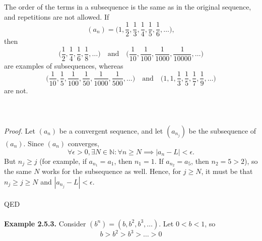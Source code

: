 \documentclass{article}
\begin{document}
                The order of the terms in a subsequence is the same as in the original sequence, and repetitions are not allowed. If
                \begin{equation*}
                    (a_n) = \bigg(1, \frac{1}{2}, \frac{1}{3}, \frac{1}{4}, \frac{1}{5}, \frac{1}{6}, \dots \bigg),
                \end{equation*}
                then
                \begin{equation*}
                    \bigg(\frac{1}{2}, \frac{1}{4}, \frac{1}{6}, \frac{1}{8}, \dots \bigg) \quad \text{and} \quad \bigg(\frac{1}{10}, \frac{1}{100}, \frac{1}{1000}, \frac{1}{10000}, \dots \bigg)
                \end{equation*}
                are examples of subsequences, whereas
                \begin{equation*}
                     \bigg(\frac{1}{10}, \frac{1}{5}, \frac{1}{100}, \frac{1}{50}, \frac{1}{1000}, \frac{1}{500}, \dots \bigg) \quad \text{and} \quad \bigg(1,1,\frac{1}{3}, \frac{1}{5}, \frac{1}{7}, \frac{1}{9}, \dots \bigg)
                \end{equation*}
                are not.
                \\ \\
                \\ \\
                \textit{Proof.} Let $(a_n)$ be a convergent sequence, and let $(a_{n_j})$ be the subsequence of $(a_n)$. Since $(a_n)$ converges, 
                \begin{equation*}
                    \forall \epsilon > 0, \exists N \in \mathbb{N}: \forall n \geq N \implies |a_n-L|<\epsilon.
                \end{equation*}
                But $n_j \geq j$ (for example, if $a_{n_1} = a_1$, then $n_1 = 1$. If $a_{n_2} = a_5$, then $n_2=5 > 2$), so the same $N$ works for the subsequence as well. Hence, for $j \geq N$, it must be that $n_j \geq j \geq N$ and $|a_{n_j}-L|<\epsilon$.\\ \\
                QED\\ \\
                \textbf{Example 2.5.3.} Consider $(b^n) = (b,b^2,b^3,\dots)$. Let $0<b<1$, so
                \begin{equation*}
                    b>b^2>b^3>\dots>0
                \end{equation*}
\end{document}
